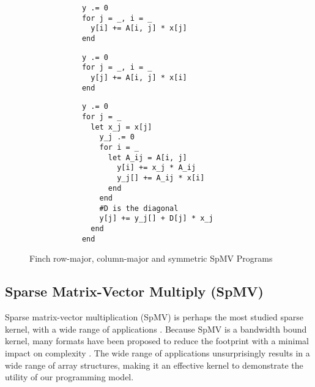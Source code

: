 \begin{wrapfigure}{r}{0.41\linewidth}
    \vspace{-28pt}
    \begin{minipage}[t]{0.18\textwidth}
        \begin{verbatim}
            y .= 0
            for j = _, i = _
              y[i] += A[i, j] * x[j]
            end
        \end{verbatim}
        \vspace{24pt} %
        \begin{verbatim}
            y .= 0
            for j = _, i = _
              y[j] += A[i, j] * x[i]
            end
        \end{verbatim}
    \end{minipage}\hfill%
    \begin{minipage}[t]{0.22\textwidth}
        \vspace{0pt} %
        \begin{verbatim}
            y .= 0
            for j = _
              let x_j = x[j]
                y_j .= 0
                for i = _
                  let A_ij = A[i, j]
                    y[i] += x_j * A_ij
                    y_j[] += A_ij * x[i]
                  end
                end
                #D is the diagonal
                y[j] += y_j[] + D[j] * x_j
              end
            end
        \end{verbatim}
    \end{minipage}
    \vspace{-8pt}
    \caption{Finch row-major, column-major and symmetric SpMV Programs}
    \label{spmv_programs}
    \vspace{-12pt}
  \end{wrapfigure}
  \subsection{Sparse Matrix-Vector Multiply (SpMV)}
  Sparse matrix-vector multiplication (SpMV) is perhaps the most studied sparse
  kernel, with a wide range of applications \cite{liu_csr5_2015,
  zhou_enabling_2020}. Because SpMV is a bandwidth bound kernel, many formats have
  been proposed to reduce the footprint with a minimal impact on complexity
  \cite{langr_evaluation_2016}. The wide range of applications unsurprisingly
  results in a wide range of array structures, making it an effective kernel to
  demonstrate the utility of our programming model. 
  
